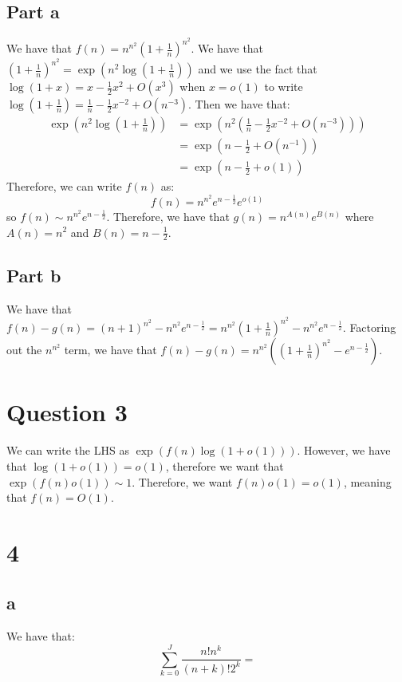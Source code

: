 \documentclass[]{article}
\begin{document}
\subsection{Part a}
We have that $f(n) = n^{n^2}(1 + \frac{1}{n})^{n^2}$. We have that $(1 + \frac{1}{n})^{n^2} = \exp\left(n^2 \log(1 + \frac{1}{n})\right)$ and we use the fact that $\log(1 + x) = x - \frac{1}{2}x^2 + O(x^3)$ when $x = o(1)$ to write $\log(1 + \frac{1}{n}) = \frac{1}{n} - \frac{1}{2}x^{-2} + O(n^{-3})$. Then we have that:
\begin{align*}
	\exp\left(n^2 \log(1 + \frac{1}{n})\right) &= \exp\left(n^2 \left(\frac{1}{n} - \frac{1}{2}x^{-2} + O(n^{-3}) \right)\right)\\
	&=  \exp\left( n  - \frac{1}{2}+ O(n^{-1})\right)\\
	&= \exp\left( n  - \frac{1}{2}+ o(1)\right)
\end{align*}
Therefore, we can write $f(n)$ as:
\begin{equation}
	f(n) = n^{n^2}e^{n - \frac{1}{2}}e^{o(1)}
\end{equation}
so $f(n) \sim n^{n^2}e^{n - \frac{1}{2}}$. 
Therefore, we have that $g(n) = n^{A(n)}e^{B(n)}$ where $A(n) = n^2$ and $B(n) = n - \frac{1}{2}$. 

\subsection{Part b}
We have that $f(n) - g(n) = (n + 1)^{n^2} - n^{n^2}e^{n - \frac{1}{2}} = n^{n^2}(1 + \frac{1}{n})^{n^2} - n^{n^2}e^{n - \frac{1}{2}}$. Factoring out the $n^{n^2}$ term, we have that $f(n) - g(n) = n^{n^2}\left((1 + \frac{1}{n})^{n^2} - e^{n - \frac{1}{2}} \right)$.


\section{Question 3}
We can write the LHS as $\exp(f(n) \log(1 + o(1)))$. However, we have that $\log(1 + o(1)) = o(1)$, therefore we want that $\exp(f(n) o(1)) \sim 1$. Therefore, we want $f(n) o(1) = o(1)$, meaning that $f(n) = O(1)$. 

\section{4}
\subsection{a}
We have that:
\begin{equation}
	\sum_{k = 0}^{J} \frac{n! n^k }{(n + k)! 2^k} = 
\end{equation}
\end{document}
